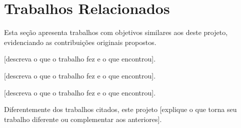 
\section{Trabalhos Relacionados}

%

Esta seção apresenta trabalhos com objetivos similares aos deste projeto, evidenciando as contribuições originais propostos.

\textcite{[chave1]} [descreva o que o trabalho fez e o que encontrou].

\textcite{[chave2]} [descreva o que o trabalho fez e o que encontrou].

\textcite{[chave3]} [descreva o que o trabalho fez e o que encontrou].

Diferentemente dos trabalhos citados, este projeto [explique o que torna seu trabalho diferente ou complementar aos anteriores].



%
